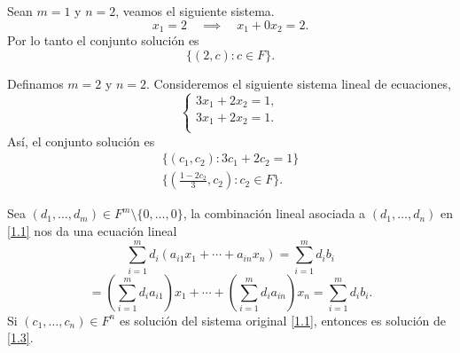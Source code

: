 \documentclass[12pt,a4paper]{book}
\newcommand{\llaves}[1]{\{#1\}}
\newcommand{\parentesis}[1]{\left(#1\right)}
\newcommand{\llavesgrande}[1]{\big\{#1\big\}}
\begin{document}
    \begin{ejemplo}
    \label{ej:3}
        Sean $m = 1$ y $n = 2$, veamos el siguiente sistema.
        \begin{equation*}
            x_{1} = 2 \quad \implies \quad x_{1} + 0x_{2} = 2.
        \end{equation*}
        Por lo tanto el conjunto solución es
        \begin{equation*}
            \llaves{(2,c):c\in F}.
        \end{equation*}
    \end{ejemplo}

    \vspace{1.4cm}

    \begin{ejemplo}
    \label{ej:4}
        Definamos $m = 2$ y $n = 2$. Consideremos el siguiente sistema lineal de ecuaciones,
        \begin{equation*}
            \begin{cases}
                3x_{1}+2x_{2} = 1,\\
                3x_{1}+2x_{2} = 1.\\
            \end{cases}
        \end{equation*}
        Así, el conjunto solución es
        \begin{align*}
            \llavesgrande{(c_{1}, c_{2}): 3c_{1} + 2c_{2} = 1}\\
            \llavesgrande{\parentesis{\tfrac{1 - 2c_{2}}{3}, c_{2}}:c_{2} \in F}.
        \end{align*}
    \end{ejemplo}

    Sea $\parentesis{d_{1}, \dots , d_{m}} \in F^{m} \setminus\llaves{0, \dots , 0}$, la combinación lineal asociada a $\parentesis{d_{1}, \dots , d_{n}}$ en \eqref{1.1} nos da una ecuación lineal
    \begin{equation*}
        \sum_{i = 1}^{m}d_{i} \parentesis{a_{i1}x_{1} + \dotsi + a_{in}x_{n}} = \sum_{i = 1}^{m}d_{i}b_{i}
    \end{equation*}
    \begin{equation*}
        = \parentesis{\sum_{i = 1}^{m}d_{i}a_{i1}} x_{1} + \dotsi + \parentesis{\sum_{i = 1}^{m}d_{i}a_{in}}x_{n} = \sum_{i = 1}^{m}d_{i}b_{i}.
        \tag{1.3}
        \label{1.3}
    \end{equation*}
    Si $\parentesis{c_{1}, \dots, c_{n}} \in F^{n}$ es solución del sistema original \eqref{1.1}, entonces es solución de \eqref{1.3}.
    
\end{document}
